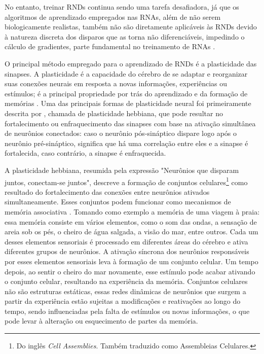 No entanto, treinar RNDs continua sendo uma tarefa desafiadora, já que os algoritmos de aprendizado empregados nas RNAs, além de
não serem biologicamente realistas, também não são diretamente aplicáveis às RNDs devido à natureza discreta dos disparos que as
torna não diferenciáveis, impedindo o cálculo de gradientes, parte fundamental no treinamento de RNAs \cite{}.

O principal método empregado para o aprendizado de RNDs é a plasticidade das sinapses. A plasticidade é a capacidade do cérebro de
se adaptar e reorganizar suas conexões neurais em resposta a novas informações, experiências ou estímulos; é a principal
propriedade por trás do aprendizado e da formação de memórias \cite{}. Uma das principais formas de plasticidade neural foi
primeiramente descrita por \cite{hebbOrganization1949}, chamada de plasticidade hebbiana, que pode resultar no fortalecimento ou
enfraquecimento das sinapses com base na ativação simultânea de neurônios conectados: caso o neurônio pós-sináptico dispare logo
após o neurônio pré-sináptico, significa que há uma correlação entre eles e a sinapse é fortalecida, caso contrário, a sinapse é
enfraquecida.

A plasticidade hebbiana, resumida pela expressão "Neurônios que disparam juntos, conectam-se juntos", descreve a formação de
conjuntos celulares\footnote{Do inglês \textit{Cell Assemblies}. Também traduzido como Assembleias Celulares.} como resultado do
fortalecimento das conexões entre neurônios ativados simultaneamente. Esses conjuntos podem funcionar como mecanismos de memória
associativa \cite{sakuraiMultiple2018}. Tomando como exemplo a memória de uma viagem à praia: essa memória consiste em vários
elementos, como o som das ondas, a sensação de areia sob os pés, o cheiro de água salgada, a visão do mar, entre outros. Cada um
desses elementos sensoriais é processado em diferentes áreas do cérebro e ativa diferentes grupos de neurônios. A ativação
síncrona dos neurônios responsáveis por esses elementos sensoriais leva à formação de um conjunto celular. Um tempo depois, ao
sentir o cheiro do mar novamente, esse estímulo pode acabar ativando o conjunto celular, resultando na experiência da memória.
Conjuntos celulares não são estruturas estáticas, essas redes dinâmicas de neurônios que surgem a partir da experiência estão
sujeitas a modificações e reativações ao longo do tempo, sendo influenciadas pela falta de estímulos ou novas informações, o que
pode levar à alteração ou esquecimento de partes da memória.

